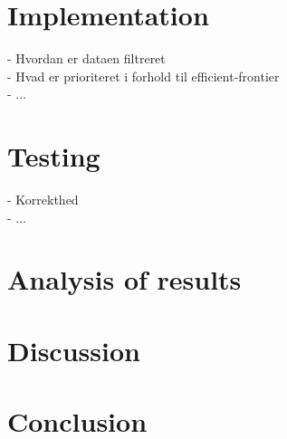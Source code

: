 \documentclass[11pt]{article}
\begin{document}
\section{Implementation}
- Hvordan er dataen filtreret \\
- Hvad er prioriteret i forhold til efficient-frontier \\
- ...


\section{Testing}
- Korrekthed \\
- ...


\section{Analysis of results}

\section{Discussion}


\section{Conclusion}
\end{document}
